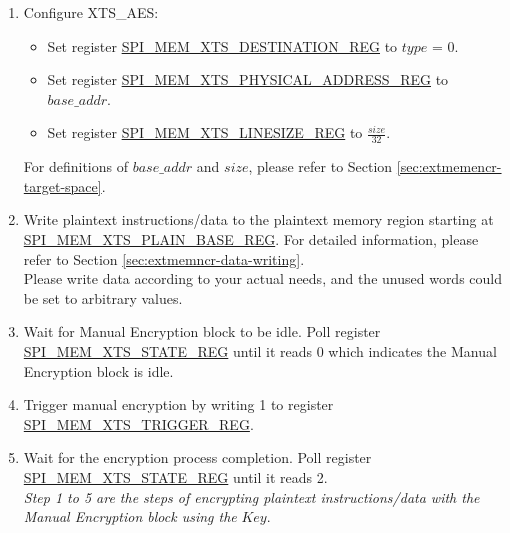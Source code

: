 \documentclass[main\_\_EN.tex]{subfiles}
\begin{document}
\begin{enumerate}

    \item Configure XTS\_AES:
    \begin{itemize}
        \item Set register \hyperref[regdesc:SPIMEMXTSDESTINATIONREG]{SPI\_MEM\_XTS\_DESTINATION\_REG} to \begin{math}type\end{math} = 0.
        \item Set register \hyperref[regdesc:SPIMEMXTSPHYSICALADDRESSREG]{SPI\_MEM\_XTS\_PHYSICAL\_ADDRESS\_REG} to \begin{math}base\_addr\end{math}.
        \item Set register \hyperref[regdesc:SPIMEMXTSLINESIZEREG]{SPI\_MEM\_XTS\_LINESIZE\_REG} to \begin{math}\frac{size}{32}\end{math}.
    \end{itemize}
    For definitions of \begin{math} base\_addr\end{math} and \begin{math}size\end{math}, please refer to Section \ref{sec:extmemencr-target-space}.

    \item Write plaintext instructions/data to the plaintext memory region starting at \hyperref[regdesc:SPIMEMXTSPLAINBASEREG]{SPI\_MEM\_XTS\_PLAIN\_BASE\_REG}. For detailed information, please refer to Section \ref{sec:extmemncr-data-writing}. \\Please write data according to your actual needs, and the unused words could be set to arbitrary values.

    \item Wait for Manual Encryption block to be idle. Poll register \hyperref[regdesc:SPIMEMXTSSTATEREG]{SPI\_MEM\_XTS\_STATE\_REG} until it reads 0 which indicates the Manual Encryption block is idle.

    \item Trigger manual encryption by writing 1 to register \hyperref[regdesc:SPIMEMXTSTRIGGERREG]{SPI\_MEM\_XTS\_TRIGGER\_REG}.

    \item Wait for the encryption process completion. Poll register \hyperref[regdesc:SPIMEMXTSSTATEREG]{SPI\_MEM\_XTS\_STATE\_REG} until it reads 2. \\ \textit{Step 1 to 5 are the steps of encrypting plaintext instructions/data with the Manual Encryption block using the} \begin{math}\mathit{Key}\end{math}.


\end{enumerate}
\end{document}
